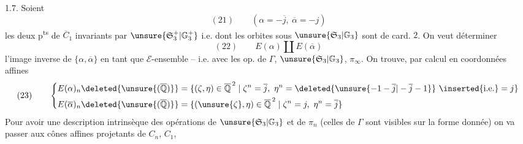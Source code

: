 1.7. Soient
\[
(21)\qquad(\alpha=-\overline j,\ \overline\alpha=-j)
\]
les deux p\textsuperscript{ts} de $\overline C_1$ invariants par
$\unsure{\mathfrak S_3^+|\mathbb G_3^+}$ i.e. dont les orbites sous
$\unsure{\mathfrak S_3|\mathbb G_3}$ sont de card. $2$. On veut déterminer
\[
(22)\qquad E(\alpha)\amalg E(\overline\alpha)
\]
l'image inverse de $\{\alpha,\overline\alpha\}$ en tant que $\mathcal E$-ensemble
-- i.e. avec les op. de $\Gamma$, $\unsure{\mathfrak S_3|\mathbb G_3}$, $\pi_\infty$.
On trouve, par calcul en coordonnées affines
\[
(23)\qquad\left\{\begin{aligned}
E(\alpha)_n\deleted{\unsure{(\overline{\mathbb Q})}}&=
\{(\zeta,\eta)\in\overline{\mathbb Q}^{\,2}\mid\zeta^n=\overline j,\
\eta^n=\deleted{\unsure{-1-\overline j|-\overline j-1}}\ \inserted{\text{i.e.}}=j\}\\
E(\overline\alpha)_n\deleted{\unsure{(\overline{\mathbb Q})}}&=
\{(\unsure{\zeta},\eta)\in\overline{\mathbb Q}^{\,2}\mid\zeta^n=j,\ \eta^n=\overline j\}
\end{aligned}\right.
\]
Pour avoir une description intrinsèque des opérations de
$\unsure{\mathfrak S_3|\mathbb G_3}$ et de $\pi_n$ (celles de $\Gamma$ sont
visibles sur la forme donnée) on va \deleted{\unsure{écrire}}
 passer aux cônes affines projetants de $C_n$, $C_1$,

